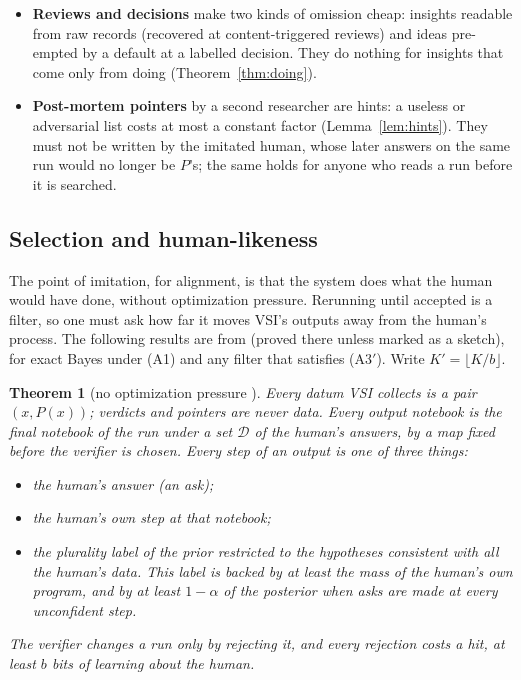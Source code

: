 \documentclass[11pt]{article}
\newtheorem{theorem}{Theorem}[section]
\theoremstyle{definition}
\theoremstyle{remark}
\newcommand{\K}{K}
\begin{document}
\begin{itemize}
\item \textbf{Reviews and decisions} make two kinds of omission cheap: insights readable from raw records (recovered at content-triggered reviews) and ideas pre-empted by a default at a labelled decision. They do nothing for insights that come only from doing (Theorem~\ref{thm:doing}).
\item \textbf{Post-mortem pointers} by a second researcher are hints: a useless or adversarial list costs at most a constant factor (Lemma~\ref{lem:hints}). They must not be written by the imitated human, whose later answers on the same run would no longer be $P$'s; the same holds for anyone who reads a run before it is searched.
\end{itemize}

\subsection{Selection and human-likeness}\label{sec:selection}
The point of imitation, for alignment, is that the system does what the human would have done, without optimization pressure. Rerunning until accepted is a filter, so one must ask how far it moves VSI's outputs away from the human's process. The following results are from \cite{threadV} (proved there unless marked as a sketch), for exact Bayes under (A1) and any filter that satisfies (A3$'$). Write $\K'=\lfloor\K/b\rfloor$.

\begin{theorem}[no optimization pressure \cite{threadV}]\label{thm:nopressure}
Every datum VSI collects is a pair $(x,P(x))$; verdicts and pointers are never data. Every output notebook is the final notebook of the run under a set $\mathcal D$ of the human's answers, by a map fixed before the verifier is chosen. Every step of an output is one of three things:
\begin{itemize}[nosep]
\item the human's answer (an ask);
\item the human's own step at that notebook;
\item the plurality label of the prior restricted to the hypotheses consistent with all the human's data. This label is backed by at least the mass of the human's own program, and by at least $1-\alpha$ of the posterior when asks are made at every unconfident step.
\end{itemize}
The verifier changes a run only by rejecting it, and every rejection costs a hit, at least $b$ bits of learning about the human.
\end{theorem}
\end{document}
